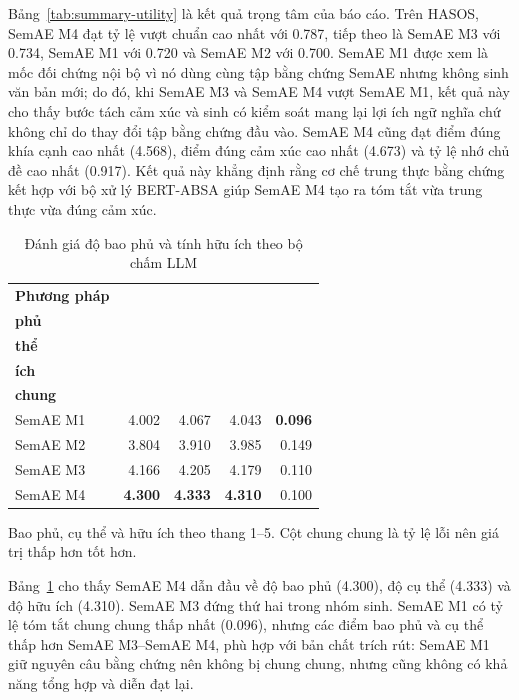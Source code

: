 Bảng~\ref{tab:summary-utility} là kết quả trọng tâm của báo cáo. Trên HASOS, SemAE M4 đạt tỷ lệ vượt chuẩn cao nhất với \num{0.787}, tiếp theo là SemAE M3 với \num{0.734}, SemAE M1 với \num{0.720} và SemAE M2 với \num{0.700}. SemAE M1 được xem là mốc đối chứng nội bộ vì nó dùng cùng tập bằng chứng SemAE nhưng không sinh văn bản mới; do đó, khi SemAE M3 và SemAE M4 vượt SemAE M1, kết quả này cho thấy bước tách cảm xúc và sinh có kiểm soát mang lại lợi ích ngữ nghĩa chứ không chỉ do thay đổi tập bằng chứng đầu vào. SemAE M4 cũng đạt điểm đúng khía cạnh cao nhất (\num{4.568}), điểm đúng cảm xúc cao nhất (\num{4.673}) và tỷ lệ nhớ chủ đề cao nhất (\num{0.917}). Kết quả này khẳng định rằng cơ chế trung thực bằng chứng kết hợp với bộ xử lý BERT-ABSA giúp SemAE M4 tạo ra tóm tắt vừa trung thực vừa đúng cảm xúc.

\begin{table}[tbp]
\centering
\caption{Đánh giá độ bao phủ và tính hữu ích theo bộ chấm LLM}
\label{tab:summary-quality}
\begin{threeparttable}
\begin{tabular}{l r r r r}
\toprule
\textbf{Phương pháp} & \makecell{\textbf{Bao}\\\textbf{phủ}} & \makecell{\textbf{Cụ}\\\textbf{thể}} & \makecell{\textbf{Hữu}\\\textbf{ích}} & \makecell{\textbf{Chung}\\\textbf{chung}} \\
\midrule
SemAE M1 & \num{4.002} & \num{4.067} & \num{4.043} & \textbf{\num{0.096}} \\
SemAE M2 & \num{3.804} & \num{3.910} & \num{3.985} & \num{0.149} \\
SemAE M3 & \num{4.166} & \num{4.205} & \num{4.179} & \num{0.110} \\
SemAE M4 & \textbf{\num{4.300}} & \textbf{\num{4.333}} & \textbf{\num{4.310}} & \num{0.100} \\
\bottomrule
\end{tabular}
\begin{tablenotes}
\footnotesize
\item Bao phủ, cụ thể và hữu ích theo thang 1--5. Cột chung chung là tỷ lệ lỗi nên giá trị thấp hơn tốt hơn.
\end{tablenotes}
\end{threeparttable}
\end{table}

Bảng~\ref{tab:summary-quality} cho thấy SemAE M4 dẫn đầu về độ bao phủ (\num{4.300}), độ cụ thể (\num{4.333}) và độ hữu ích (\num{4.310}). SemAE M3 đứng thứ hai trong nhóm sinh. SemAE M1 có tỷ lệ tóm tắt chung chung thấp nhất (\num{0.096}), nhưng các điểm bao phủ và cụ thể thấp hơn SemAE M3--SemAE M4, phù hợp với bản chất trích rút: SemAE M1 giữ nguyên câu bằng chứng nên không bị chung chung, nhưng cũng không có khả năng tổng hợp và diễn đạt lại.

